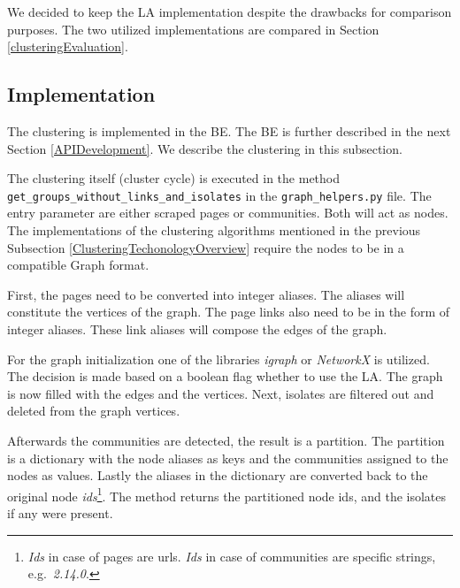 We decided to keep the LA implementation despite the drawbacks for comparison purposes. The two utilized implementations are compared in Section \ref{clusteringEvaluation}.

\subsection{Implementation} \label{ClusteringImplementation}
The clustering is implemented in the BE. The BE is further described in the next Section \ref{APIDevelopment}. We describe the clustering in this subsection. 

The clustering itself (cluster cycle) is executed in the method \\ \texttt{get\_groups\_without\_links\_and\_isolates} in the \texttt{graph\_helpers.py} file. The entry parameter are either scraped pages or communities. Both will act as nodes. The implementations of the clustering algorithms mentioned in the previous Subsection \ref{ClusteringTechonologyOverview} require the nodes to be in a compatible Graph format. 

First, the pages need to be converted into integer aliases. The aliases will constitute the vertices of the graph. The page links also need to be in the form of integer aliases. These link aliases will compose the edges of the graph.

 For the graph initialization one of the libraries \textit{igraph} or \textit{NetworkX} is utilized. The decision is made based on a boolean flag whether to use the LA. The graph is now filled with the edges and the vertices. Next, isolates are filtered out and deleted from the graph vertices. 

Afterwards the communities are detected, the result is a partition. The partition is a dictionary with the node aliases as keys and the communities assigned to the nodes as values. Lastly the aliases in the dictionary are converted back to the original node \textit{ids}\footnote{\textit{Ids} in case of pages are urls. \textit{Ids} in case of communities are specific strings, e.g.~\textit{2.14.0}.}. The method returns the partitioned node ids, and the isolates if any were present. 

